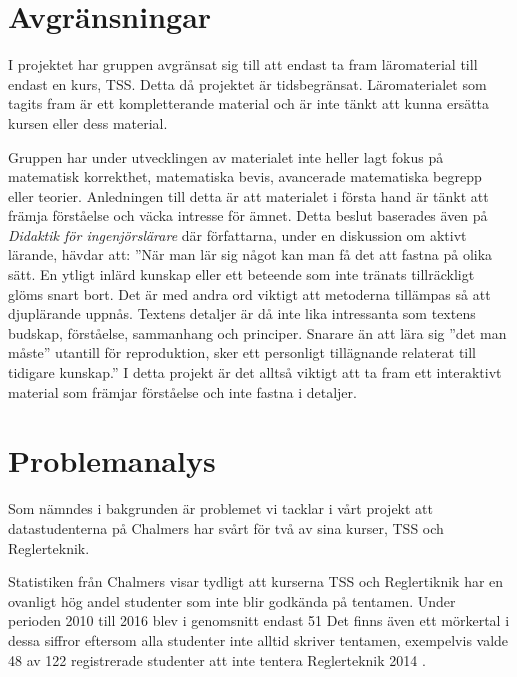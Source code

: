 \documentclass[]{article}
\begin{document}
\section{Avgränsningar}

I projektet har gruppen avgränsat sig till att endast ta fram läromaterial
till endast en kurs, TSS. Detta då projektet är tidsbegränsat.
Läromaterialet som tagits fram är ett kompletterande material och är inte
tänkt att kunna ersätta kursen eller dess material.

Gruppen har under utvecklingen av materialet inte heller lagt fokus på matematisk korrekthet,
matematiska bevis, avancerade matematiska begrepp eller teorier.  Anledningen till detta är att
materialet  i första hand är tänkt att främja förståelse och väcka intresse för ämnet. Detta beslut
baserades även på \textit{Didaktik för ingenjörslärare} där författarna, under en diskussion om aktivt lärande,
hävdar att: ”När man lär sig något kan man få det att fastna på olika sätt. En ytligt inlärd kunskap
eller ett beteende som inte tränats tillräckligt glöms snart bort. Det är med andra ord viktigt att
metoderna tillämpas så att djuplärande uppnås. Textens detaljer är då inte lika intressanta som textens
budskap, förståelse, sammanhang och principer. Snarare än att lära sig ”det man måste” utantill för
reproduktion, sker ett personligt tillägnande relaterat till tidigare kunskap.” I detta projekt är det
alltså viktigt att ta fram ett interaktivt material som främjar förståelse och inte fastna i detaljer.

\section{Problemanalys}


Som nämndes i bakgrunden är problemet vi tacklar i vårt projekt att
datastudenterna på Chalmers har svårt för två av sina kurser,
TSS och Reglerteknik.

Statistiken från Chalmers visar tydligt att kurserna TSS och Reglertiknik
har en ovanligt hög andel studenter som inte blir godkända på tentamen.
Under perioden 2010 till 2016 blev i genomsnitt endast 51
Det finns även ett mörkertal i dessa siffror eftersom alla studenter
inte alltid skriver tentamen, exempelvis valde 48 av 122 registrerade
studenter att inte tentera Reglerteknik 2014
\cite{kursinformation:ere102:14-15}.
\end{document}
